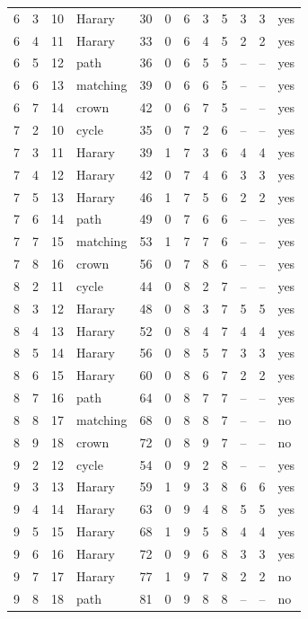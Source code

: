 {\begin{longtable}{rrrlrrrrrrrl}
6 & 3 & 10 & Harary & 30 & 0 & 6 & 3 & 5 & 3 & 3 & yes\\
6 & 4 & 11 & Harary & 33 & 0 & 6 & 4 & 5 & 2 & 2 & yes\\
6 & 5 & 12 & path & 36 & 0 & 6 & 5 & 5 & -- & -- & yes\\
6 & 6 & 13 & matching & 39 & 0 & 6 & 6 & 5 & -- & -- & yes\\
6 & 7 & 14 & crown & 42 & 0 & 6 & 7 & 5 & -- & -- & yes\\
7 & 2 & 10 & cycle & 35 & 0 & 7 & 2 & 6 & -- & -- & yes\\
7 & 3 & 11 & Harary & 39 & 1 & 7 & 3 & 6 & 4 & 4 & yes\\
7 & 4 & 12 & Harary & 42 & 0 & 7 & 4 & 6 & 3 & 3 & yes\\
7 & 5 & 13 & Harary & 46 & 1 & 7 & 5 & 6 & 2 & 2 & yes\\
7 & 6 & 14 & path & 49 & 0 & 7 & 6 & 6 & -- & -- & yes\\
7 & 7 & 15 & matching & 53 & 1 & 7 & 7 & 6 & -- & -- & yes\\
7 & 8 & 16 & crown & 56 & 0 & 7 & 8 & 6 & -- & -- & yes\\
8 & 2 & 11 & cycle & 44 & 0 & 8 & 2 & 7 & -- & -- & yes\\
8 & 3 & 12 & Harary & 48 & 0 & 8 & 3 & 7 & 5 & 5 & yes\\
8 & 4 & 13 & Harary & 52 & 0 & 8 & 4 & 7 & 4 & 4 & yes\\
8 & 5 & 14 & Harary & 56 & 0 & 8 & 5 & 7 & 3 & 3 & yes\\
8 & 6 & 15 & Harary & 60 & 0 & 8 & 6 & 7 & 2 & 2 & yes\\
8 & 7 & 16 & path & 64 & 0 & 8 & 7 & 7 & -- & -- & yes\\
8 & 8 & 17 & matching & 68 & 0 & 8 & 8 & 7 & -- & -- & no\\
8 & 9 & 18 & crown & 72 & 0 & 8 & 9 & 7 & -- & -- & no\\
9 & 2 & 12 & cycle & 54 & 0 & 9 & 2 & 8 & -- & -- & yes\\
9 & 3 & 13 & Harary & 59 & 1 & 9 & 3 & 8 & 6 & 6 & yes\\
9 & 4 & 14 & Harary & 63 & 0 & 9 & 4 & 8 & 5 & 5 & yes\\
9 & 5 & 15 & Harary & 68 & 1 & 9 & 5 & 8 & 4 & 4 & yes\\
9 & 6 & 16 & Harary & 72 & 0 & 9 & 6 & 8 & 3 & 3 & yes\\
9 & 7 & 17 & Harary & 77 & 1 & 9 & 7 & 8 & 2 & 2 & no\\
9 & 8 & 18 & path & 81 & 0 & 9 & 8 & 8 & -- & -- & no\\

\end{longtable}}
